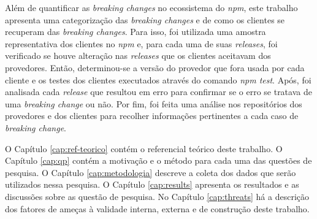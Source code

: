 Além de quantificar as \textit{breaking changes} no ecossistema do \textit{npm}, este trabalho apresenta uma categorização das \textit{breaking changes} e de como os clientes se recuperam das \textit{breaking changes}. Para isso, foi utilizada uma amostra representativa dos clientes no \textit{npm} e, para cada uma de suas \textit{releases}, foi verificado se houve alteração nas \textit{releases} que os clientes aceitavam dos provedores. Então, determinou-se a versão do provedor que fora usada por cada cliente e os testes dos clientes executados através do comando \textit{npm test}. Após, foi analisada cada \textit{release} que resultou em erro para confirmar se o erro se tratava de uma \textit{breaking change} ou não. Por fim, foi feita uma análise nos repositórios dos provedores e dos clientes para recolher informações pertinentes a cada caso de \textit{breaking change}.

O Capítulo \ref{cap:ref-teorico} contém o referencial teórico deste trabalho. O Capítulo \ref{cap:qp} contém a motivação e o método para cada uma das questões de pesquisa. O Capítulo \ref{cap:metodologia} descreve a coleta dos dados que serão utilizados nessa pesquisa. O Capítulo \ref{cap:results} apresenta os resultados e as discussões sobre as questão de pesquisa. No Capítulo \ref{cap:threats} há a descrição dos fatores de ameças à validade interna, externa e de construção deste trabalho.%


